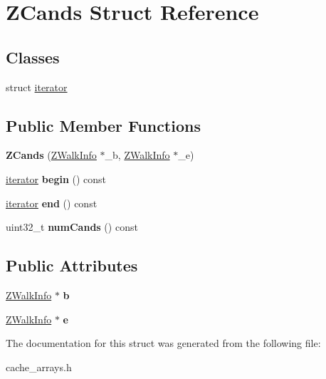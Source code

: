 \hypertarget{structZCands}{\section{Z\-Cands Struct Reference}
\label{structZCands}
}
\subsection*{Classes}
\begin{DoxyCompactItemize}
\item 
struct \hyperlink{structZCands_1_1iterator}{iterator}
\end{DoxyCompactItemize}
\subsection*{Public Member Functions}
\begin{DoxyCompactItemize}
\item 
\hypertarget{structZCands_a45c689a57d82ae2daf76411fe37f81c8}{{\bfseries Z\-Cands} (\hyperlink{structZWalkInfo}{Z\-Walk\-Info} $\ast$\-\_\-b, \hyperlink{structZWalkInfo}{Z\-Walk\-Info} $\ast$\-\_\-e)}\label{structZCands_a45c689a57d82ae2daf76411fe37f81c8}

\item 
\hypertarget{structZCands_a15e74b4a743bb5ed0d30a929c0008850}{\hyperlink{structZCands_1_1iterator}{iterator} {\bfseries begin} () const }\label{structZCands_a15e74b4a743bb5ed0d30a929c0008850}

\item 
\hypertarget{structZCands_ab00fa501162fb281147e8d599861791f}{\hyperlink{structZCands_1_1iterator}{iterator} {\bfseries end} () const }\label{structZCands_ab00fa501162fb281147e8d599861791f}

\item 
\hypertarget{structZCands_a013dea49e81176ac3eb674dabb1c00d6}{uint32\-\_\-t {\bfseries num\-Cands} () const }\label{structZCands_a013dea49e81176ac3eb674dabb1c00d6}

\end{DoxyCompactItemize}
\subsection*{Public Attributes}
\begin{DoxyCompactItemize}
\item 
\hypertarget{structZCands_a8b34ee85109756662477f2f42aae3001}{\hyperlink{structZWalkInfo}{Z\-Walk\-Info} $\ast$ {\bfseries b}}\label{structZCands_a8b34ee85109756662477f2f42aae3001}

\item 
\hypertarget{structZCands_a981206bea796148e99fd48e691b6d6ef}{\hyperlink{structZWalkInfo}{Z\-Walk\-Info} $\ast$ {\bfseries e}}\label{structZCands_a981206bea796148e99fd48e691b6d6ef}

\end{DoxyCompactItemize}


The documentation for this struct was generated from the following file\-:\begin{DoxyCompactItemize}
\item 
cache\-\_\-arrays.\-h\end{DoxyCompactItemize}
